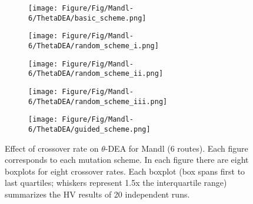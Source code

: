\begin{figure}[!htbp]
	\centering
	\begin{subfigure}[b]{0.52\textwidth}
		\texttt{[image: Figure/Fig/Mandl-6/ThetaDEA/basic\_scheme.png]}
	\end{subfigure}%
	\begin{subfigure}[b]{0.52\textwidth}
		\texttt{[image: Figure/Fig/Mandl-6/ThetaDEA/random\_scheme\_i.png]}
	\end{subfigure}%
	\newline
	\begin{subfigure}[b]{0.52\textwidth}
		\texttt{[image: Figure/Fig/Mandl-6/ThetaDEA/random\_scheme\_ii.png]}
	\end{subfigure}%
	\begin{subfigure}[b]{0.52\textwidth}
		\texttt{[image: Figure/Fig/Mandl-6/ThetaDEA/random\_scheme\_iii.png]}
	\end{subfigure}%
	\newline
	\begin{subfigure}[b]{0.52\textwidth}
		\texttt{[image: Figure/Fig/Mandl-6/ThetaDEA/guided\_scheme.png]}
	\end{subfigure}%
	\caption{Effect of crossover rate on $\theta$-DEA for Mandl (6 routes). Each figure corresponds to each mutation scheme. In each figure there are eight boxplots for eight crossover rates.  Each boxplot (box spans first to last quartiles; whiskers represent 1.5x the interquartile range) summarizes the HV results of 20 independent runs.}
	\label{fig:cr_mandl6_thetadea}
\end{figure}

